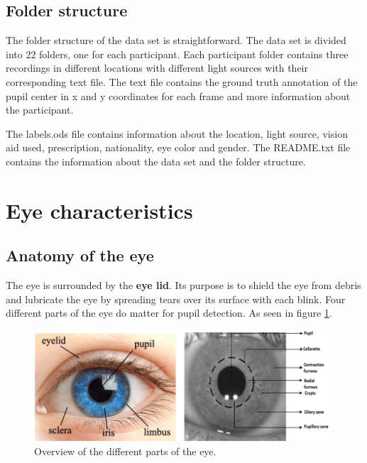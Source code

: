     \subsection{Folder structure}
    The folder structure of the data set is straightforward. The data set is divided into 22 folders, one for each participant. Each participant folder contains three recordings in different locations with different light sources with their corresponding text file.
    The text file contains the ground truth annotation of the pupil center in x and y coordinates for each frame and more information about the participant. 
    
    The labels.ods file contains information about the location, light source, vision aid used, prescription, nationality, eye color and gender. The README.txt file contains the information about the data set and the folder structure.
    \newpage
    \section{Eye characteristics}
    \subsection{Anatomy of the eye}
    The eye is surrounded by the \textbf{eye lid}. Its purpose is to shield the eye from debris and lubricate the eye by spreading tears over its surface with each blink. Four different parts of the eye do matter for pupil detection. As seen in figure \ref{fig:eye_anatomy}.
    \begin{figure}[h]
      \centering
      \includegraphics[width=0.98\textwidth]{plots/eye_dataset/Various-characteristics-of-an-eye-and-its-iris-texture-7.png}
      \caption{Overview of the different parts of the eye.}
      \label{fig:eye_anatomy}
    \end{figure}
    
